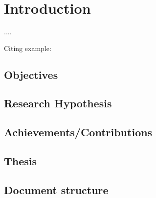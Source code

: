 \chapter{Introduction}\label{c:intro}

....

Citing example: \cite{GRM97}

\section{Objectives}

\section{Research Hypothesis}

\section{Achievements/Contributions}

\section{Thesis}

\section{Document structure}\label{s:struct}

